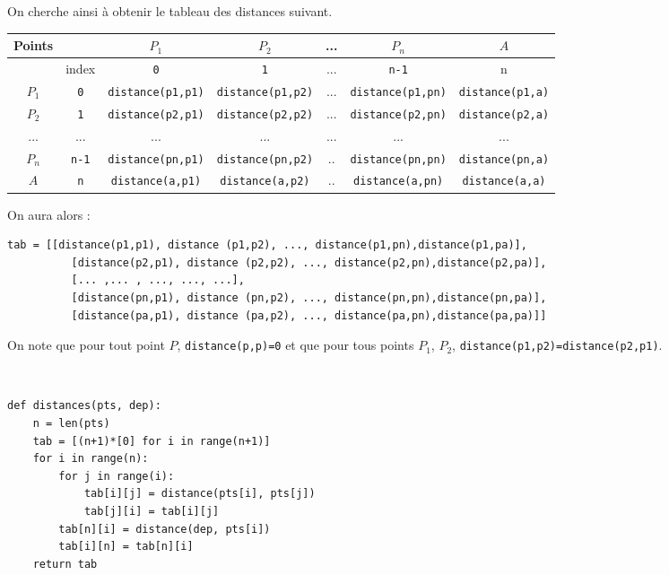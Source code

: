 On cherche ainsi à obtenir le tableau des distances suivant. 
\begin{center}
\begin{tabular}{|c|c||c|c|c|c|c|}
\hline 
Points& & $P_1$ & $P_2$ & ... & $P_n$ & $A$ \\ \hline
&index & \texttt{0} & \texttt{1} & ... & \texttt{n-1} & n \\ \hline\hline
$P_1$  & \texttt{0} & \texttt{distance(p1,p1)} & \texttt{distance(p1,p2)} &  ... & \texttt{distance(p1,pn)} & \texttt{distance(p1,a)}  \\ \hline
$P_2$ & \texttt{1} & \texttt{distance(p2,p1)} & \texttt{distance(p2,p2)} &  ... & \texttt{distance(p2,pn)} & \texttt{distance(p2,a)}  \\ \hline
... & ... & ... & ... & ... & ...& ... \\ \hline
$P_n$ & \texttt{n-1} & \texttt{distance(pn,p1)} & \texttt{distance(pn,p2)} &  .. & \texttt{distance(pn,pn)} & \texttt{distance(pn,a)}  \\ \hline
$A$  & \texttt{n} & \texttt{distance(a,p1)} & \texttt{distance(a,p2)} &  .. & \texttt{distance(a,pn)} & \texttt{distance(a,a)}  \\ \hline
\end{tabular}
\end{center}

On aura alors :
\begin{lstlisting}
tab = [[distance(p1,p1), distance (p1,p2), ..., distance(p1,pn),distance(p1,pa)],
          [distance(p2,p1), distance (p2,p2), ..., distance(p2,pn),distance(p2,pa)],
          [... ,... , ..., ..., ...],
          [distance(pn,p1), distance (pn,p2), ..., distance(pn,pn),distance(pn,pa)],
          [distance(pa,p1), distance (pa,p2), ..., distance(pa,pn),distance(pa,pa)]]
\end{lstlisting}
                                        
On note que pour tout point $P$, \texttt{distance(p,p)=0} et que pour tous points $P_1$, $P_2$, \texttt{distance(p1,p2)=distance(p2,p1)}.
\fi

\ifprof
\begin{corrige} ~\\


\begin{lstlisting}
def distances(pts, dep):
    n = len(pts)
    tab = [(n+1)*[0] for i in range(n+1)]
    for i in range(n):
        for j in range(i):
            tab[i][j] = distance(pts[i], pts[j])
            tab[j][i] = tab[i][j]
        tab[n][i] = distance(dep, pts[i])
        tab[i][n] = tab[n][i]
    return tab
\end{lstlisting}
\end{corrige}
\else
\fi



